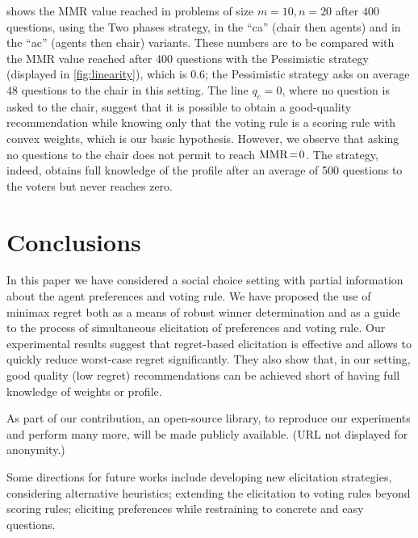 \documentclass[runningheads]{llncs}
\begin{document}
 shows the MMR value reached in problems of size $m = 10, n = 20$ after $400$ questions, using the Two phases strategy, in the “ca” (chair then agents) and in the “ac” (agents then chair) variants. These numbers are to be compared with the MMR value reached after 400 questions with the Pessimistic strategy (displayed in \cref{fig:linearity}), which is $0.6$; the Pessimistic strategy asks on average $48$ questions to the chair in this setting.
The line $q_c = 0$, where no question is asked to the chair, suggest that it is possible to obtain a good-quality recommendation while knowing only that the voting rule is a scoring rule with convex weights, which is our basic hypothesis. However, we observe that asking no questions to the chair does not permit to reach $\operatorname{MMR}\!=\!0$. The strategy, indeed, obtains full knowledge of the profile after an average of 500 questions to the voters but never reaches zero.

\section{Conclusions}  
\label{sec:conclusions}
In this paper we have considered a social choice setting with partial information about the agent preferences and voting rule.
We have proposed the use of minimax regret both as a means of robust winner determination and as a guide to the process of simultaneous elicitation of preferences and voting rule.
Our experimental results %
suggest that regret-based elicitation is effective and allows to quickly reduce worst-case regret significantly. They also show that, in our setting, good quality (low regret) recommendations can be achieved short of having full knowledge of weights or profile.

As part of our contribution, an open-source library, to reproduce our experiments and perform many more, will be made publicly available. (URL not displayed for anonymity.)

Some directions for future works include developing new elicitation strategies, considering alternative heuristics; extending the elicitation to voting rules beyond scoring rules; eliciting preferences while restraining to concrete and easy questions.
%
%
%


%
\end{document}
